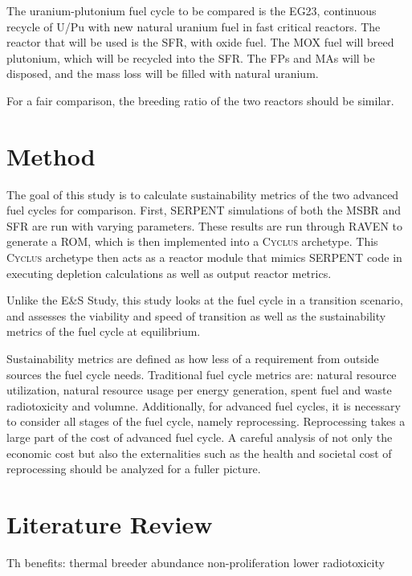 \documentclass{article}
\newcommand{\Cyclus}{\textsc{Cyclus}\xspace}%
\begin{document}
The uranium-plutonium fuel cycle to be compared is the 
EG23, continuous recycle of U/Pu with new natural uranium
fuel in fast critical reactors. The reactor that will be used
is the \gls{SFR}, with oxide fuel. The \gls{MOX} fuel will 
breed plutonium, which will be recycled into the \gls{SFR}.
The \glspl{FP} and \glspl{MA} will be disposed, and the 
mass loss will be filled with natural uranium.

For a fair comparison, the breeding ratio of the two
reactors should be similar.

\section{Method}

The goal of this study is to calculate sustainability
metrics of the two advanced fuel cycles for comparison.
First, SERPENT simulations of both the \gls{MSBR} and \gls{SFR}
are run with varying parameters. These results are run
through RAVEN \cite{rabiti_mathematical_2013} to generate
a \gls{ROM}, which is then implemented into a \Cyclus
archetype. This \Cyclus archetype then acts as a reactor
module that mimics SERPENT code in executing depletion
calculations as well as output reactor metrics.

Unlike the E\&S Study, this study looks at the 
fuel cycle in a transition scenario, and assesses
the viability and speed of transition as well as
the sustainability metrics of the fuel cycle at equilibrium.

Sustainability metrics are defined as how less of a requirement
from outside sources the fuel cycle needs. Traditional fuel cycle
metrics are: natural resource utilization, natural resource
usage per energy generation, spent fuel and waste radiotoxicity
and volumne.  Additionally, for advanced fuel cycles,
it is necessary to consider all stages of the fuel cycle,
namely reprocessing. Reprocessing takes a large part of the 
cost of advanced fuel cycle. A careful analysis of not only
the economic cost but also the externalities such as the health and societal cost of 
reprocessing should be analyzed for a fuller picture.


\section{Literature Review}

Th benefits:
    thermal breeder
    abundance
    non-proliferation
    lower radiotoxicity
\end{document}
